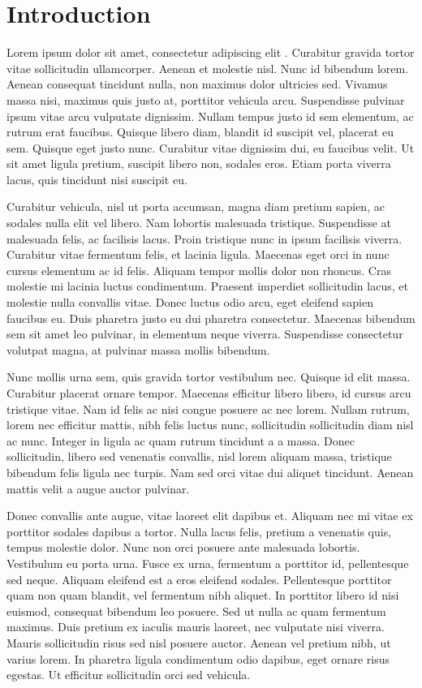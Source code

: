 \chapter{Introduction}
\label{chap:intro}

Lorem ipsum dolor sit amet, consectetur adipiscing
elit \parencite[xiii]{mandelbrot:2004}. Curabitur gravida tortor vitae
sollicitudin ullamcorper. Aenean et molestie nisl. Nunc id bibendum
lorem. Aenean consequat tincidunt nulla, non maximus dolor ultricies
sed. Vivamus massa nisi, maximus quis justo at, porttitor vehicula
arcu. Suspendisse pulvinar ipsum vitae arcu vulputate dignissim. Nullam
tempus justo id sem elementum, ac rutrum erat faucibus. Quisque libero
diam, blandit id suscipit vel, placerat eu sem. Quisque eget justo
nunc. Curabitur vitae dignissim dui, eu faucibus velit. Ut sit amet
ligula pretium, suscipit libero non, sodales eros. Etiam porta viverra
lacus, quis tincidunt nisi suscipit eu.

Curabitur vehicula, nisl ut porta accumsan, magna diam pretium sapien,
ac sodales nulla elit vel libero. Nam lobortis malesuada
tristique. Suspendisse at malesuada felis, ac facilisis lacus. Proin
tristique nunc in ipsum facilisis viverra. Curabitur vitae fermentum
felis, et lacinia ligula. Maecenas eget orci in nunc cursus elementum ac
id felis. Aliquam tempor mollis dolor non rhoncus. Cras molestie mi
lacinia luctus condimentum. Praesent imperdiet sollicitudin lacus, et
molestie nulla convallis vitae. Donec luctus odio arcu, eget eleifend
sapien faucibus eu. Duis pharetra justo eu dui pharetra
consectetur. Maecenas bibendum sem sit amet leo pulvinar, in elementum
neque viverra. Suspendisse consectetur volutpat magna, at pulvinar massa
mollis bibendum.

Nunc mollis urna sem, quis gravida tortor vestibulum nec. Quisque id
elit massa. Curabitur placerat ornare tempor. Maecenas efficitur libero
libero, id cursus arcu tristique vitae. Nam id felis ac nisi congue
posuere ac nec lorem. Nullam rutrum, lorem nec efficitur mattis, nibh
felis luctus nunc, sollicitudin sollicitudin diam nisl ac nunc. Integer
in ligula ac quam rutrum tincidunt a a massa. Donec sollicitudin, libero
sed venenatis convallis, nisl lorem aliquam massa, tristique bibendum
felis ligula nec turpis. Nam sed orci vitae dui aliquet
tincidunt. Aenean mattis velit a augue auctor pulvinar.

Donec convallis ante augue, vitae laoreet elit dapibus et. Aliquam nec
mi vitae ex porttitor sodales dapibus a tortor. Nulla lacus felis,
pretium a venenatis quis, tempus molestie dolor. Nunc non orci posuere
ante malesuada lobortis. Vestibulum eu porta urna. Fusce ex urna,
fermentum a porttitor id, pellentesque sed neque. Aliquam eleifend est a
eros eleifend sodales. Pellentesque porttitor quam non quam blandit, vel
fermentum nibh aliquet. In porttitor libero id nisi euismod, consequat
bibendum leo posuere. Sed ut nulla ac quam fermentum maximus. Duis
pretium ex iaculis mauris laoreet, nec vulputate nisi viverra. Mauris
sollicitudin risus sed nisl posuere auctor. Aenean vel pretium nibh, ut
varius lorem. In pharetra ligula condimentum odio dapibus, eget ornare
risus egestas. Ut efficitur sollicitudin orci sed vehicula.

